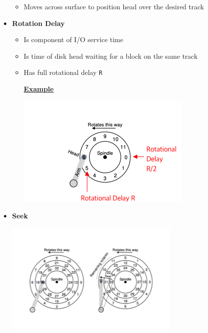 \documentclass[12pt]{article}
\begin{document}
\begin{itemize}
    \begin{itemize}
        \item Moves across surface to position head over the desired track
    \end{itemize}

    \item \textbf{Rotation Delay}
    \begin{itemize}
        \item Is component of I/O service time
        \item Is time of disk head waiting for a block on the same track
        \item Has full rotational delay \texttt{R}

        \bigskip

        \underline{\textbf{Example}}

        \bigskip

        \begin{center}
            \includegraphics[width=0.6\linewidth]{../images/midterm_4_solution_57.png}
        \end{center}
    \end{itemize}

    \item \textbf{Seek}

    \begin{center}
        \includegraphics[width=0.6\linewidth]{../images/midterm_4_solution_55.png}
    \end{center}


\end{itemize}
\end{document}
